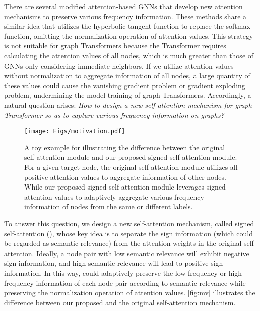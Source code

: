 \documentclass[sigconf, screen]{acmart}
\begin{document}
There are several modified attention-based GNNs \cite{fagcn,sign1,sign2} that develop new attention mechanisms to preserve various frequency information.  
These methods share a similar idea that utilizes the hyperbolic tangent function to replace the softmax function, omitting the normalization operation of attention values.
This strategy is not suitable for graph Transformers because the Transformer requires calculating the attention values of all nodes, which is much greater than those of GNNs only considering immediate neighbors.
If we utilize attention values without normalization to aggregate information of all nodes, a large quantity of these values could cause the vanishing gradient problem or gradient exploding problem, undermining the model training of graph Transformers.
Accordingly, a natural question arises: 
\textit{How to design a new self-attention mechanism for graph Transformer so as to capture 
various frequency information on graphs?}


\begin{figure}[t]
\centering
\texttt{[image: Figs/motivation.pdf]}
\caption{
A toy example for illustrating the difference between the original self-attention module and our proposed signed self-attention module. 
For a given target node, the original self-attention module utilizes all positive attention values to aggregate information of other nodes.
While our proposed signed self-attention module leverages signed attention values to adaptively aggregate various frequency information of nodes from the same or different labels. 
}
\label{fig:mv}
\vspace{-1em}
\end{figure}


To answer this question, we design a new self-attention mechanism, called signed self-attention (\saname), whose key idea is to separate the sign information (which could be regarded as semantic relevance) from the attention weights in the original self-attention.
Ideally, a node pair with low semantic relevance will exhibit negative sign information, and high semantic relevance will lead to positive sign information.
In this way, \saname could adaptively preserve the low-frequency or high-frequency information of each node pair according to semantic relevance while preserving the normalization operation of attention values.
\autoref{fig:mv} illustrates the difference between our proposed \saname and the original self-attention mechanism. 
\end{document}
